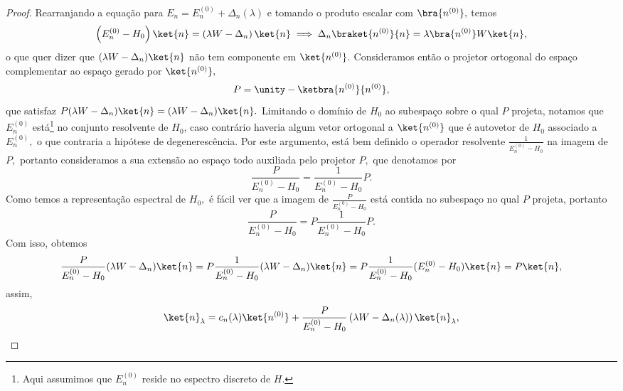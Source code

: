 \begin{proof}
    Rearranjando a equação para \(E_n = E_n^{(0)} + \Delta_n(\lambda)\) e tomando o produto escalar com \(\bra{n^{(0)}},\) temos
    \begin{equation*}
        \left(E_n^{(0)} - H_0\right) \ket{n} = \left(\lambda W - \Delta_n\right)\ket{n} \implies \Delta_n \braket{n^{(0)}}{n} = \lambda \bra{n^{(0)}}W\ket{n},
    \end{equation*}
    o que quer dizer que \((\lambda W - \Delta_n)\ket{n}\) não tem componente em \(\ket{n^{(0)}}.\) Consideramos então o projetor ortogonal do espaço complementar ao espaço gerado por \(\ket{n^{(0)}},\)
    \begin{equation*}
        P = \unity - \ketbra{n^{(0)}}{n^{(0)}},
    \end{equation*}
    que satisfaz \(P(\lambda W - \Delta_n)\ket{n} = (\lambda W - \Delta_n)\ket{n}.\) Limitando o domínio de \(H_0\) ao subespaço sobre o qual \(P\) projeta, notamos que \(E_n^{(0)}\) está\footnote{Aqui assumimos que \(E_n^{(0)}\) reside no espectro discreto de \(H.\)} no conjunto resolvente de \(H_0\), caso contrário haveria algum vetor ortogonal a \(\ket{n^{(0)}}\) que é autovetor de \(H_0\) associado a \(E_n^{(0)},\) o que contraria a hipótese de degenerescência. Por este argumento, está bem definido o operador resolvente \(\frac{1}{E_n^{(0)} - H_0}\) na imagem de \(P,\) portanto consideramos a sua extensão ao espaço todo auxiliada pelo projetor \(P,\) que denotamos por
    \begin{equation*}
        \frac{P}{E_n^{(0)} - H_0} = \frac{1}{E_n^{(0)} - H_0} P.
    \end{equation*}
    Como temos a representação espectral de \(H_0,\) é fácil ver que a imagem de \(\frac{P}{E_n^{(0)} - H_0}\) está contida no subespaço no qual \(P\) projeta, portanto
    \begin{equation*}
        \frac{P}{E_n^{(0)} - H_0} = P \frac{1}{E_n^{(0)} - H_0}P.
    \end{equation*}
    Com isso, obtemos
    \begin{equation*}
        \frac{P}{E_n^{(0)}-H_0} (\lambda W - \Delta_n) \ket{n} =  P \frac{1}{E_n^{(0)} - H_0}(\lambda W - \Delta_n)\ket{n} = P \frac{1}{E_n^{(0)} - H_0} (E_n^{(0)} - H_0) \ket{n} = P \ket{n},
    \end{equation*}
    assim,
    \begin{equation*}
        \ket{n}_\lambda = c_n(\lambda)\ket{n^{(0)}} + \frac{P}{E_n^{(0)} - H_0}\left(\lambda W - \Delta_n(\lambda)\right) \ket{n}_\lambda,

\end{equation*}
\end{proof}
